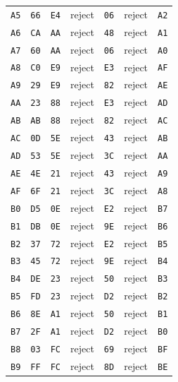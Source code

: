 \begin{longtable}{lllllll}
\texttt{A5} & \texttt{66} & \texttt{E4} & reject & \texttt{06} & reject & \texttt{A2}\\
\texttt{A6} & \texttt{CA} & \texttt{AA} & reject & \texttt{48} & reject & \texttt{A1}\\
\texttt{A7} & \texttt{60} & \texttt{AA} & reject & \texttt{06} & reject & \texttt{A0}\\
\texttt{A8} & \texttt{C0} & \texttt{E9} & reject & \texttt{E3} & reject & \texttt{AF}\\
\texttt{A9} & \texttt{29} & \texttt{E9} & reject & \texttt{82} & reject & \texttt{AE}\\
\texttt{AA} & \texttt{23} & \texttt{88} & reject & \texttt{E3} & reject & \texttt{AD}\\
\texttt{AB} & \texttt{AB} & \texttt{88} & reject & \texttt{82} & reject & \texttt{AC}\\
\texttt{AC} & \texttt{0D} & \texttt{5E} & reject & \texttt{43} & reject & \texttt{AB}\\
\texttt{AD} & \texttt{53} & \texttt{5E} & reject & \texttt{3C} & reject & \texttt{AA}\\
\texttt{AE} & \texttt{4E} & \texttt{21} & reject & \texttt{43} & reject & \texttt{A9}\\
\texttt{AF} & \texttt{6F} & \texttt{21} & reject & \texttt{3C} & reject & \texttt{A8}\\
\texttt{B0} & \texttt{D5} & \texttt{0E} & reject & \texttt{E2} & reject & \texttt{B7}\\
\texttt{B1} & \texttt{DB} & \texttt{0E} & reject & \texttt{9E} & reject & \texttt{B6}\\
\texttt{B2} & \texttt{37} & \texttt{72} & reject & \texttt{E2} & reject & \texttt{B5}\\
\texttt{B3} & \texttt{45} & \texttt{72} & reject & \texttt{9E} & reject & \texttt{B4}\\
\texttt{B4} & \texttt{DE} & \texttt{23} & reject & \texttt{50} & reject & \texttt{B3}\\
\texttt{B5} & \texttt{FD} & \texttt{23} & reject & \texttt{D2} & reject & \texttt{B2}\\
\texttt{B6} & \texttt{8E} & \texttt{A1} & reject & \texttt{50} & reject & \texttt{B1}\\
\texttt{B7} & \texttt{2F} & \texttt{A1} & reject & \texttt{D2} & reject & \texttt{B0}\\
\texttt{B8} & \texttt{03} & \texttt{FC} & reject & \texttt{69} & reject & \texttt{BF}\\
\texttt{B9} & \texttt{FF} & \texttt{FC} & reject & \texttt{8D} & reject & \texttt{BE}\\

\end{longtable}
